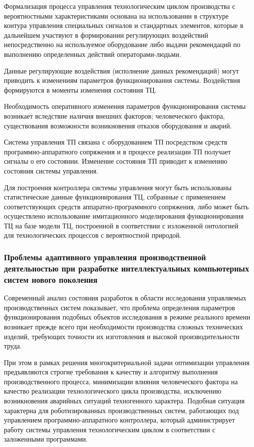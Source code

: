 Формализация процесса управления технологическим циклом производства с  вероятностными характеристиками основана на использовании в структуре контура управления специальных сигналов и стандартных элементов, которые в дальнейшем участвуют в формировании регулирующих воздействий непосредственно на используемое оборудование либо выдачи рекомендаций по выполнению определенных действий операторами-людьми.

Данные регулирующие воздействия (исполнение данных рекомендаций) могут приводить к изменениям параметров функционирования системы. Воздействия формируются в моменты изменения состояния ТЦ.

Необходимость оперативного изменения параметров функционирования системы возникает вследствие наличия внешних факторов; человеческого фактора, существования возможности возникновения отказов оборудования и аварий.

Система управления ТП связана с оборудованием ТП посредством средств программно-аппаратного сопряжения и в процессе реализации ТП получает сигналы о его состоянии. Изменение состояния ТП приводит к изменению состояния системы управления.

Для построения контроллера системы управления могут быть использованы статистические данные функционирования ТЦ, собранные с применением соответствующих средств аппаратно-программного сопряжения, либо может быть осуществлено использование имитационного моделирования функционирования ТЦ на базе модели ТЦ, построенной в соответствии с изложенной онтологией для технологических процессов с вероятностной природой.



\subsubsection{Проблемы адаптивного управления производственной деятельностью при разработке интеллектуальных компьютерных систем нового поколения}
\label{sec_chapter_enterprise_adaptive_control_problems}


Современный анализ состояния разработок в области исследования управляемых производственных систем показывает, что проблема определения параметров функционирования подобных объектов исследования в режиме реального времени возникает прежде всего при необходимости производства сложных технических изделий, требующих точности их изготовления и высокой производительности труда.

При этом в рамках решения многокритериальной задачи оптимизации управления предъявляются строгие требования к качеству и алгоритму выполнения производственного процесса, минимизации влияния человеческого фактора на качество реализации технологического цикла производства, исключению возникновения аварийных ситуаций техногенного характера. Подобная ситуация характерна для роботизированных производственных систем, работающих под управлением программно-аппаратного контроллера, который администрирует работу системы управления технологическим циклом в соответствии с заложенными программами.

